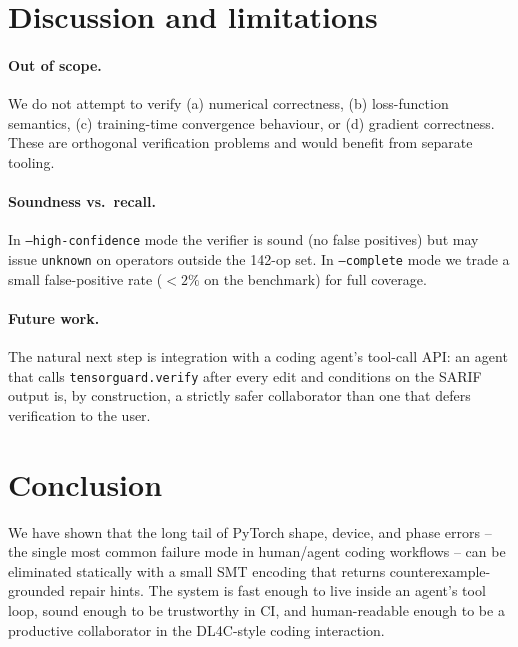 \documentclass{article}
\theoremstyle{definition}
\begin{document}
\section{Discussion and limitations}

\paragraph{Out of scope.}  We do not attempt to verify (a) numerical
correctness, (b) loss-function semantics, (c) training-time
convergence behaviour, or (d) gradient correctness.  These are
orthogonal verification problems and would benefit from separate
tooling.

\paragraph{Soundness vs.\ recall.}  In \texttt{--high-confidence}
mode the verifier is sound (no false positives) but may issue
\texttt{unknown} on operators outside the 142-op set.  In
\texttt{--complete} mode we trade a small false-positive rate
($<2\%$ on the benchmark) for full coverage.

\paragraph{Future work.}  The natural next step is integration with a
coding agent's tool-call API: an agent that calls
\texttt{tensorguard.verify} after every edit and conditions on the
SARIF output is, by construction, a strictly safer collaborator than
one that defers verification to the user.

\section{Conclusion}

We have shown that the long tail of PyTorch shape, device, and phase
errors -- the single most common failure mode in human/agent coding
workflows -- can be eliminated statically with a small SMT encoding
that returns counterexample-grounded repair hints.  The system is
fast enough to live inside an agent's tool loop, sound enough to be
trustworthy in CI, and human-readable enough to be a productive
collaborator in the DL4C-style coding interaction.
\end{document}
